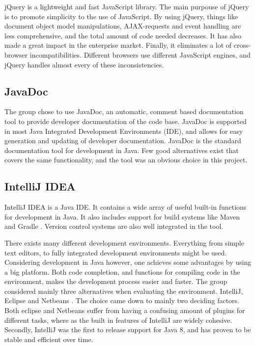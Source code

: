 jQuery \cite{jquery} is a lightweight and fast JavaScript library. The main purpouse of jQuery is to promote simplicity to the use of JavaScript. By using jQuery, things like document object model manipulations, AJAX-requests and event handling are less comprehensive, and the total amount of code needed decreases. It has also made a great impact in the enterprise market. Finally, it eliminates a lot of cross-browser incompatibilities. Different browsers use different JavaScript engines, and jQuery handles almost every of these inconsistencies.

\subsection{JavaDoc}
\label{subsec:prestudies-tools-javadoc}

The group chose to use JavaDoc, an automatic, comment based documentation tool to provide developer documentation of the code base. JavaDoc is supported in most Java Integrated Development Environments (IDE), and allows for easy generation and updating of developer documentation. JavaDoc is the standard documentation tool for development in Java. Few good alternatives exist that covers the same functionality, and the tool was an obvious choice in this project.

\subsection{IntelliJ IDEA}
\label{subsec:prestudies-tools-intellij_idea}

IntelliJ IDEA \cite{intellij-idea} is a Java IDE. It contains a wide array of useful built-in functions for development in Java. It also includes support for build systems like Maven \cite{maven} and Gradle \cite{gradle}. Version control systems are also well integrated in the tool.

There exists many different development environments. Everything from simple text editors, to fully integrated development environments might be used. Considering development in Java however, one achieves some advantages by using a big platform. Both code completion, and functions for compiling code in the environment, makes the development process easier and faster. The group considered mainly three alternatives when evaluating the environment. IntelliJ, Eclipse \cite{eclipse} and Netbeans \cite{netbeans}. The choice came down to mainly two deciding factors. Both eclipse and Netbeans suffer from having a confusing amount of plugins for different tasks, where as the built in features of IntelliJ are widely cohesive. Secondly, IntelliJ was the first to release support for Java 8, and has proven to be stable and efficient over time.

